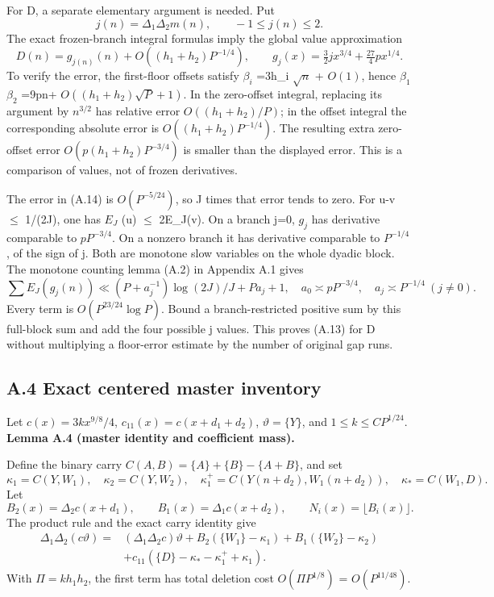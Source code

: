 \documentclass[11pt,a4paper]{article}
\begin{document}
For D, a separate elementary argument is needed. Put \[
j(n)=\Delta_1\Delta_2m(n),\qquad -1\le j(n)\le2.
\] The exact frozen-branch integral formulas imply the global value
approximation \[
D(n)=g_{j(n)}(n)+O((h_1+h_2)P^{-1/4}),\qquad
g_j(x)=\tfrac32j x^{3/4}+\tfrac{27}{4}p x^{1/4}. \tag{A.14}
\] To verify the error, the first-floor offsets satisfy \(\beta_i\)
=3h\_i \(\sqrt{n}\) + \(O(1)\), hence \(\beta_1\) \(\beta_2\) =9pn+
\(O((h_1+h_2)\sqrt{P}+1)\). In the zero-offset integral, replacing its
argument by \(n^{3/2}\) has relative error \(O((h_1+h_2)/P)\); in the
offset integral the corresponding absolute error is
\(O((h_1+h_2)P^{-1/4})\). The resulting extra zero-offset error
\(O(p(h_1+h_2)P^{-3/4})\) is smaller than the displayed error. This is a
comparison of values, not of frozen derivatives.

The error in (A.14) is \(O(P^{-5/24})\), so J times that error tends to
zero. For \textbar u-v\textbar{} \(\le\) 1/(2J), one has \(E_J\) (u)
\(\le\) 2E\_J(v). On a branch j=0, \(g_j\) has derivative comparable to
\(pP^{-3/4}\). On a nonzero branch it has derivative comparable to
\(P^{-1/4}\), of the sign of j. Both are monotone slow variables on the
whole dyadic block. The monotone counting lemma (A.2) in Appendix A.1
gives \[
\sum E_J(g_j(n))
\ll (P+a_j^{-1})\log(2J)/J+Pa_j+1,
\quad
a_0\asymp pP^{-3/4},\quad a_j\asymp P^{-1/4}\ (j\ne0).
\] Every term is \(O(P^{23/24} \log P)\). Bound a branch-restricted
positive sum by this full-block sum and add the four possible j values.
This proves (A.13) for D without multiplying a floor-error estimate by
the number of original gap runs.

\subsection{A.4 Exact centered master
inventory}\label{a.4-exact-centered-master-inventory}

Let \(c(x)=3kx^{9/8}/4\), \(c_{11}(x)=c(x+d_1+d_2)\),
\(\vartheta=\{Y\}\), and \(1\le k\le CP^{1/24}\). \textbf{Lemma A.4
(master identity and coefficient mass).}

Define the binary carry \(C(A,B)=\{A\}+\{B\}-\{A+B\}\), and set \[
\kappa_1=C(Y,W_1),\quad \kappa_2=C(Y,W_2),\quad
\kappa_1^+=C(Y(n+d_2),W_1(n+d_2)),\quad
\kappa_*=C(W_1,D).
\] Let \[
B_2(x)=\Delta_2c(x+d_1),\qquad
B_1(x)=\Delta_1c(x+d_2),\qquad N_i(x)=\lfloor B_i(x)\rfloor .
\] The product rule and the exact carry identity give \[
\begin{split}
\Delta_1\Delta_2(c\vartheta)
={}&(\Delta_1\Delta_2c)\vartheta
+B_2(\{W_1\}-\kappa_1)+B_1(\{W_2\}-\kappa_2)\\
&+c_{11}(\{D\}-\kappa_*-\kappa_1^++\kappa_1).
\end{split} \tag{A.15}
\] With \(\Pi=kh_1h_2\), the first term has total deletion cost
\(O(\Pi P^{1/8})\) = \(O(P^{11/48})\).
\end{document}
